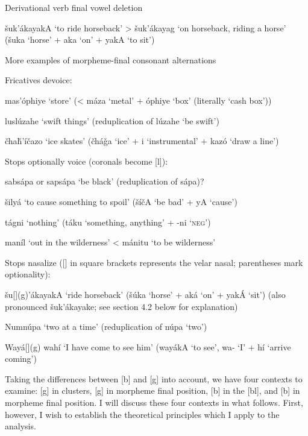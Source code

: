 \documentclass[output=paper]{LSP/langsci}
\begin{document}
\begin{exe}\label{ex:rood:7}
\ex Derivational verb final vowel deletion

\v{s}uk'\'akayakA `to ride horseback' > \v{s}uk'\'akayag `on horseback, riding a horse' (\v{s}uka `horse' + aka `on' + yakA `to sit')
\end{exe}

\begin{exe}\label{ex:rood:8}
\ex More examples of morpheme-final consonant alternations
\begin{xlist}
\ex Fricatives devoice:

mas'\'ophiye `store' (< m\'aza `metal' + \'ophiye `box' (literally `cash box'))

lusl\'uzahe `swift things' (reduplication of l\'uzahe `be swift')

\v{c}ha\v{h}'\'i\v{c}azo `ice skates' (\v{c}h\'a\v{g}a `ice' + i `instrumental' + kaz\'o `draw a line')

\ex Stops optionally voice (coronals become [l]):

sabs\'apa or saps\'apa `be black' (reduplication of s\'apa)?

\v{s}ily\'a `to cause something to spoil' (\v{s}\'i\v{c}A `be bad' + yA `cause')

t\'agni `nothing' (t\'aku `something, anything' + -ni `\textsc{neg}')

man\'il `out in the wilderness' < m\'anitu `to be wilderness'

\ex Stops nasalize ([] in square brackets represents the velar nasal; parentheses mark optionality):

\v{s}u[](g)'\'akayakA `ride horseback' (\v{s}\'uka `horse' + ak\'a `on' + yak\'A `sit') (also pronounced \v{s}uk'\'akayake; see section 4.2 below for explanation)

Numn\'upa `two at a time' (reduplication of n\'upa `two')

Way\'a[](g) wah\'i `I have come to see him' (way\'akA `to see', wa- `I' + h\'i `arrive coming')
\end{xlist}
\end{exe}

Taking the differences between [b] and [g] into account, we have four contexts to examine: [g] in clusters, [g] in morpheme final position, [b] in the  [bl], and [b] in morpheme final position. I will discuss these four contexts in what follows. First, however, I wish to establish the theoretical principles which I apply to the analysis.
\end{document}
